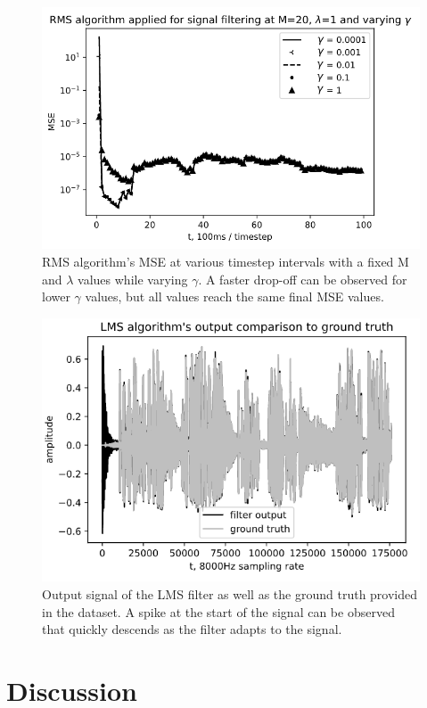 \documentclass[10pt,a4paper,twocolumn]{article}
\begin{document}
\begin{figure} %
	[!h]
	\centering
	\includegraphics*[width=.8\columnwidth]{f7.png} %
	\caption{RMS algorithm's MSE at various timestep intervals with a fixed M and $\lambda$ values while varying $\gamma$. A faster drop-off can be observed for lower $\gamma$ values, but all values reach the same final MSE values.}
	\label{f7}
	\vspace{6pt}
\end{figure}


\begin{figure} %
	[!h]
	\centering
	\includegraphics*[width=.8\columnwidth]{f8.png} %
	\caption{Output signal of the LMS filter as well as the ground truth provided in the dataset. A spike at the start of the signal can be observed that quickly descends as the filter adapts to the signal.}
	\label{f8}
	\vspace{6pt}
\end{figure}

\section*{Discussion}
\end{document}
